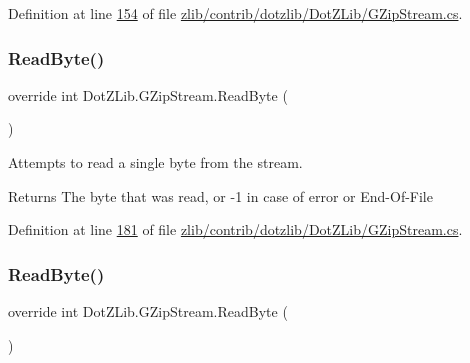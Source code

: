 Definition at line \hyperlink{zlib_2contrib_2dotzlib_2_dot_z_lib_2_g_zip_stream_8cs_source_l00154}{154} of file \hyperlink{zlib_2contrib_2dotzlib_2_dot_z_lib_2_g_zip_stream_8cs_source}{zlib/contrib/dotzlib/\+Dot\+Z\+Lib/\+G\+Zip\+Stream.\+cs}.

\mbox{\label{class_dot_z_lib_1_1_g_zip_stream_aedb91212e360ab574bca4745e2189201}} 
\subsubsection{\texorpdfstring{Read\+Byte()}{ReadByte()}\hspace{0.1cm}{\footnotesize\ttfamily [1/2]}}
{\footnotesize\ttfamily override int Dot\+Z\+Lib.\+G\+Zip\+Stream.\+Read\+Byte (\begin{DoxyParamCaption}{ }\end{DoxyParamCaption})\hspace{0.3cm}{\ttfamily [inline]}}



Attempts to read a single byte from the stream. 

\begin{DoxyReturn}{Returns}
The byte that was read, or -\/1 in case of error or End-\/\+Of-\/\+File
\end{DoxyReturn}


Definition at line \hyperlink{zlib_2contrib_2dotzlib_2_dot_z_lib_2_g_zip_stream_8cs_source_l00181}{181} of file \hyperlink{zlib_2contrib_2dotzlib_2_dot_z_lib_2_g_zip_stream_8cs_source}{zlib/contrib/dotzlib/\+Dot\+Z\+Lib/\+G\+Zip\+Stream.\+cs}.

\mbox{\label{class_dot_z_lib_1_1_g_zip_stream_aedb91212e360ab574bca4745e2189201}} 
\subsubsection{\texorpdfstring{Read\+Byte()}{ReadByte()}\hspace{0.1cm}{\footnotesize\ttfamily [2/2]}}
{\footnotesize\ttfamily override int Dot\+Z\+Lib.\+G\+Zip\+Stream.\+Read\+Byte (\begin{DoxyParamCaption}{ }\end{DoxyParamCaption})\hspace{0.3cm}{\ttfamily [inline]}}



